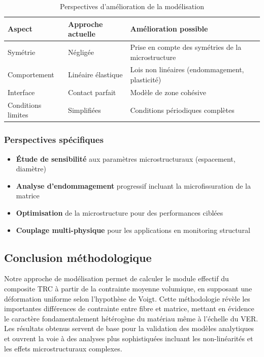 \documentclass{rapportECL}
\begin{document}
\begin{table}[h]
\centering
\caption{Perspectives d'amélioration de la modélisation}
\begin{tabular}{|l|l|l|}
\hline
\textbf{Aspect} & \textbf{Approche actuelle} & \textbf{Amélioration possible} \\
\hline
Symétrie & Négligée & Prise en compte des symétries de la microstructure \\
Comportement & Linéaire élastique & Lois non linéaires (endommagement, plasticité) \\
Interface & Contact parfait & Modèle de zone cohésive \\
Conditions limites & Simplifiées & Conditions périodiques complètes \\
\hline
\end{tabular}
\end{table}

\subsubsection{Perspectives spécifiques}
\begin{itemize}
    \item \textbf{Étude de sensibilité} aux paramètres microstructuraux (espacement, diamètre)
    \item \textbf{Analyse d'endommagement} progressif incluant la microfissuration de la matrice
    \item \textbf{Optimisation} de la microstructure pour des performances ciblées
    \item \textbf{Couplage multi-physique} pour les applications en monitoring structural
\end{itemize}

\subsection{Conclusion méthodologique}

Notre approche de modélisation permet de calculer le module effectif du composite TRC à partir de la contrainte moyenne volumique, en supposant une déformation uniforme selon l'hypothèse de Voigt. Cette méthodologie révèle les importantes différences de contrainte entre fibre et matrice, mettant en évidence le caractère fondamentalement hétérogène du matériau même à l'échelle du VER. Les résultats obtenus servent de base pour la validation des modèles analytiques et ouvrent la voie à des analyses plus sophistiquées incluant les non-linéarités et les effets microstructuraux complexes.
\end{document}
